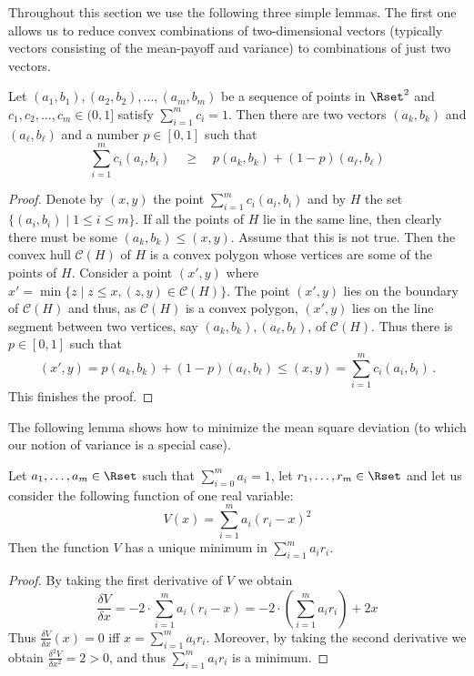 Throughout this section we use the following three simple lemmas. The first one allows us to reduce convex combinations of two-dimensional vectors (typically vectors consisting of the mean-payoff and variance) to combinations of just two vectors.
\begin{lemma}\label{lem:approx-two}
Let $(a_1,b_1), (a_2,b_2),\ldots, (a_m,b_m)$ be a sequence of points in $\Rset^2$ and $c_1,c_2,\ldots , c_m \in (0,1]$ satisfy $\sum_{i=1}^{m} c_i=1$. Then there are two vectors $(a_k,b_k)$ and $(a_{\ell},b_{\ell})$ and a number $p\in [0,1]$ such that
\[
\sum_{i=1}^{m} c_i (a_i,b_i)\quad  \geq \quad p (a_k,b_k) + (1-p) (a_{\ell},b_{\ell})
\]
\end{lemma}
\begin{proof}
Denote by $(x,y)$ the point $\sum_{i=1}^{m} c_i (a_i,b_i)$ and by $H$ the set $\{(a_i,b_i)\mid 1\leq i\leq m\}$.
If all the points of $H$ lie in the same line, then clearly there must be some $(a_k,b_k)\leq (x,y)$.
Assume that this is not true. Then the convex hull $\mathcal{C}(H)$ of $H$ is a convex polygon whose vertices are some of the points of $H$. Consider a point $(x',y)$ where $x'=\min\{z\mid z\leq x, (z,y)\in \mathcal{C}(H)\}$. The point $(x',y)$ lies on the boundary of $\mathcal{C}(H)$ and thus, as $\mathcal{C}(H)$ is a convex polygon, $(x',y)$ lies on the line segment between two vertices, say $(a_k,b_k),(a_{\ell},b_{\ell})$, of $\mathcal{C}(H)$. Thus there is $p\in [0,1]$ such that
\[(x',y)=p(a_k,b_k)+(1-p)(a_{\ell},b_{\ell})\leq (x,y)=\sum_{i=1}^{m} c_i (a_i,b_i)\,.\]
This finishes the proof.
\end{proof}
\noindent
The following lemma shows how to minimize the mean square deviation (to which our notion of variance is a special case).
\begin{lemma}\label{lem:min-var}
Let $a_1,\ldots,a_m\in \Rset$ such that $\sum_{i=0}^{m} a_i = 1$, let $r_1,\ldots,r_m\in \Rset$ and let us consider the following function of one real variable:
\[
V(x)=\sum_{i=1}^m a_i \left(r_i - x\right)^2
\]
Then the function $V$ has a unique minimum in $\sum_{i=1}^m a_i r_i$.
\end{lemma}
\begin{proof}
By taking the first derivative of $V$ we obtain
\[
\frac{\delta V}{\delta x} = -2\cdot  \sum_{i=1}^m a_i \left(r_i - x\right)
  = -2\cdot \left(\sum_{i=1}^m a_i r_i\right)+2x
\]
Thus $\frac{\delta{V}}{\delta x}(x)=0$ iff $x=\sum_{i=1}^m a_i r_i$.
Moreover, by taking the second derivative we obtain $\frac{\delta^2 V}{\delta x^2}=2>0$, and thus $\sum_{i=1}^m a_i r_i$ is a minimum.
\end{proof}
